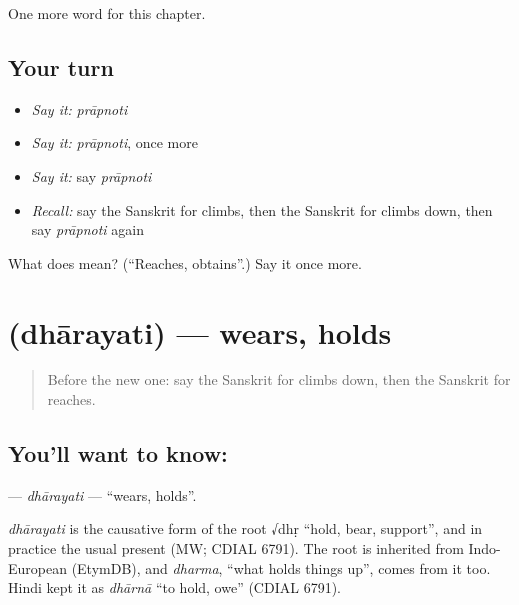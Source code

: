 \begin{grammarlens}[title={What you've built}]
One more word for this chapter.
\end{grammarlens}

\subsection*{Your turn}
\begin{itemize}
\raggedright
  \item \emph{Say it:} \emph{prāpnoti}
  \item \emph{Say it:} \emph{prāpnoti}, once more
  \item \emph{Say it:} say \emph{prāpnoti}
  \item \emph{Recall:} say the Sanskrit for climbs, then the Sanskrit for climbs down, then say \emph{prāpnoti} again
\end{itemize}

\begin{tcolorbox}[breakable,colback=teal!4,colframe=teal!35!black,title={Before you move on}]
What does  mean? (\textquotedblleft{}Reaches, obtains\textquotedblright{}.) Say it once more.
\end{tcolorbox}
\section[\texorpdfstring{\sk{धारयति} (dhārayati)}{धारयति (dhārayati)}]{ (dhārayati) — wears, holds}

\label{lesson:SA-C136-dharayati}



\begin{quote}
Before the new one: say the Sanskrit for climbs down, then the Sanskrit for reaches.
\end{quote}

\subsection*{You'll want to know: }
\textbf{} — \emph{dhārayati} — \textquotedblleft{}wears, holds\textquotedblright{}.

\begin{cousinweb}
\emph{dhārayati} is the causative form of the root √dhṛ \textquotedblleft{}hold, bear, support\textquotedblright{}, and in practice the usual present (MW; CDIAL 6791). The root is inherited from Indo-European (EtymDB), and \emph{dharma}, \textquotedblleft{}what holds things up\textquotedblright{}, comes from it too. Hindi kept it as \emph{dhārnā} \textquotedblleft{}to hold, owe\textquotedblright{} (CDIAL 6791).
\end{cousinweb}

